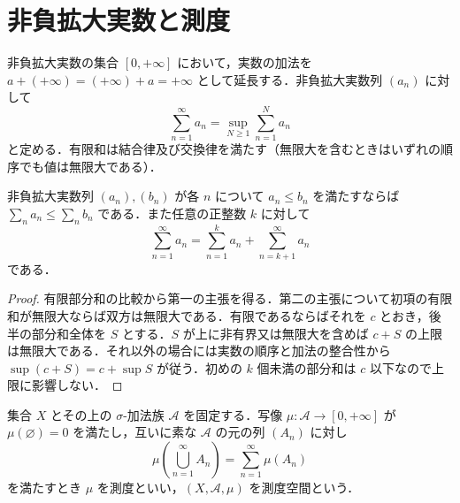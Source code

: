 \section{非負拡大実数と測度}
\begin{defn}[非負拡大実数の和]
非負拡大実数の集合 $[0,+\infty]$ において，実数の加法を $a+(+\infty)=(+\infty)+a=+\infty$ として延長する．非負拡大実数列 $(a_n)$ に対して
\[
 \sum_{n=1}^{\infty}a_n=\sup_{N\geq1}\sum_{n=1}^N a_n
\]
と定める．有限和は結合律及び交換律を満たす（無限大を含むときはいずれの順序でも値は無限大である）．
\end{defn}
\begin{prop}[非負級数の単調性]
非負拡大実数列 $(a_n),(b_n)$ が各 $n$ について $a_n\leq b_n$ を満たすならば $\sum_n a_n\leq\sum_n b_n$ である．また任意の正整数 $k$ に対して
\[
 \sum_{n=1}^{\infty}a_n=\sum_{n=1}^{k}a_n+\sum_{n=k+1}^{\infty}a_n
\]
である．
\end{prop}
\begin{proof}
有限部分和の比較から第一の主張を得る．第二の主張について初項の有限和が無限大ならば双方は無限大である．有限であるならばそれを $c$ とおき，後半の部分和全体を $S$ とする．$S$ が上に非有界又は無限大を含めば $c+S$ の上限は無限大である．それ以外の場合には実数の順序と加法の整合性から $\sup(c+S)=c+\sup S$ が従う．初めの $k$ 個未満の部分和は $c$ 以下なので上限に影響しない．
\end{proof}
\begin{defn}[測度と測度空間]
集合 $X$ とその上の $\sigma$-加法族 $\mathcal A$ を固定する．写像 $\mu:\mathcal A\to[0,+\infty]$ が $\mu(\varnothing)=0$ を満たし，互いに素な $\mathcal A$ の元の列 $(A_n)$ に対し
\[
 \mu\left(\bigcup_{n=1}^{\infty}A_n\right)=\sum_{n=1}^{\infty}\mu(A_n)
\]
を満たすとき $\mu$ を測度といい，$(X,\mathcal A,\mu)$ を測度空間という．
\end{defn}
